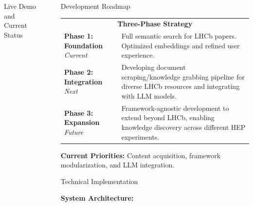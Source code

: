 \documentclass[final]{beamer}
\newlength{\sepwidth}
\newlength{\colwidth}
\newcommand{\separatorcolumn}{\begin{column}{\sepwidth}\end{column}}
\begin{document}
\begin{frame}[t]
\begin{columns}[t]
\begin{column}{\colwidth}
\begin{exampleblock}{Live Demo and Current Status}
    
  \end{exampleblock}

\end{column}

\separatorcolumn

\begin{column}{\colwidth}

  \begin{block}{Development Roadmap}
    
    \begin{tabular}{p{}|p{}}
      \multicolumn{2}{c}{\Large \textbf{Three-Phase Strategy}} \\[0.4cm]
      
      \large \textbf{Phase 1: Foundation} \newline
      \large \textit{Current} &
      \large Full semantic search for LHCb papers. Optimized embeddings and refined user experience. \\[1.2cm]
      
      \large \textbf{Phase 2: Integration} \newline
      \large \textit{Next} &
      \large Developing document scraping/knowledge grabbing pipeline for diverse LHCb resources and integrating with LLM models. \\[1.2cm]
      
      \large \textbf{Phase 3: Expansion} \newline
      \large \textit{Future} &
      \large Framework-agnostic development to extend beyond LHCb, enabling knowledge discovery across different HEP experiments. \\[0.8cm]
    \end{tabular}
    
    \vspace{0.5cm}
    
    \large \textbf{Current Priorities:} Content acquisition, framework modularization, and LLM integration.
    
  \end{block}

  \begin{block}{Technical Implementation}
    
    \textbf{System Architecture:}
    

\end{block}
\end{column}
\end{columns}
\end{frame}
\end{document}
